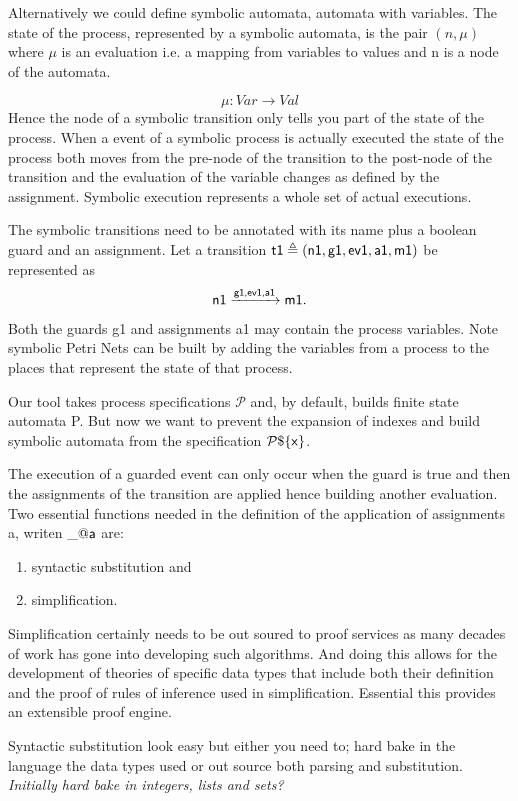 \documentclass[]{article}
\begin{document}
Alternatively we could define symbolic automata, automata with variables.
The state of  the process, represented by a symbolic automata, is   the pair $(n,\mu)$ where $\mu$ is an  evaluation i.e. a mapping from variables to values and n is a node of the automata.

\[\mu: Var \rightarrow Val\]
Hence the node of a symbolic transition only tells you part of the state of the process. When a event of a symbolic process is actually executed the state of the process both moves from the pre-node of the transition to the post-node of the transition and the evaluation of the variable changes as defined by the assignment.  Symbolic execution represents a whole set of actual executions.

The symbolic  transitions need  to be annotated  with its name plus a boolean guard and an assignment. Let a transition  ${\sf t1 \triangleq (n1,g1,ev1,a1,m1)}$  be represented as
\[{\sf n1\xrightarrow{\text{\sf g1,ev1,a1}} m1}.\]
Both the guards {\sf g1} and assignments {\sf a1} may contain the process variables.  Note symbolic Petri Nets can be built by adding the variables from a process to the places that represent the state of that process.

Our tool takes process specifications $\mathcal{P}$ and,  by default, builds finite state automata {\sf P}. But now we want to prevent the expansion of indexes and build symbolic automata  from the specification ${\sf \mathcal{P}\$\{x\}}$.

The execution of a guarded  event  can only occur when the guard is true  and then the assignments of the transition are applied hence building another evaluation. Two  essential functions needed in the definition of the application of assignments {\sf a}, writen  $\_@{\sf a}$ are:
\begin{enumerate}
\item syntactic substitution and
\item simplification.
\end{enumerate}

Simplification certainly needs to be out soured to proof services as  many decades of work has gone into developing such algorithms. And doing this allows for the development of theories of specific data types that include both their definition and the proof of rules of inference used in simplification. Essential this provides an extensible proof engine.

Syntactic substitution look easy but  either you need to; hard bake in the language the data types used or out source both  parsing and substitution. \emph{Initially hard bake in integers, lists and sets?}
\end{document}
